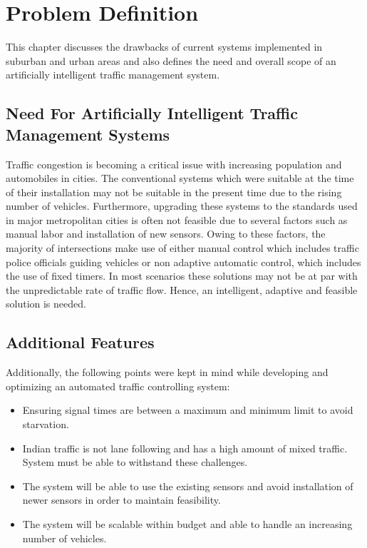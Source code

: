 \documentclass[openany,12pt]{report}
\begin{document}
	
	
	\chapter{Problem Definition}
	
	\hspace*{0.5in}This chapter discusses the drawbacks of current systems implemented in suburban and urban areas and also defines the need and overall scope of an artificially intelligent traffic management system.\\
	
	\section{Need For Artificially Intelligent Traffic Management Systems}
	\hspace*{0.5in}Traffic congestion is becoming a critical issue with increasing population and automobiles in cities. The conventional systems which were suitable at the time of their installation may not be suitable in the present time due to the rising number of vehicles. Furthermore, upgrading these systems to the standards used in major metropolitan cities is often not feasible due to several factors such as manual labor and installation of new sensors. Owing to these factors, the majority of intersections make use of either manual control which includes traffic police officials guiding vehicles or non adaptive automatic control, which includes the use of fixed timers. In most scenarios these solutions may not be at par with the unpredictable rate of traffic flow. Hence, an intelligent, adaptive and feasible solution is needed.\\
	
	\section{Additional Features}
	\hspace*{0.5in}Additionally, the following points were kept in mind while developing and optimizing an automated traffic controlling system:\\
	
	\begin{itemize}
		\item{Ensuring signal times are between a maximum and minimum limit to avoid starvation.}
		\item{Indian traffic is not lane following and has a high amount of mixed traffic. System must be able to withstand these challenges.}
		\item{The system will be able to use the existing sensors and avoid installation of newer sensors in order to maintain feasibility.}
		\item{The system will be scalable within budget and able to handle an increasing number of vehicles.}
	\end{itemize}
	
\end{document}
